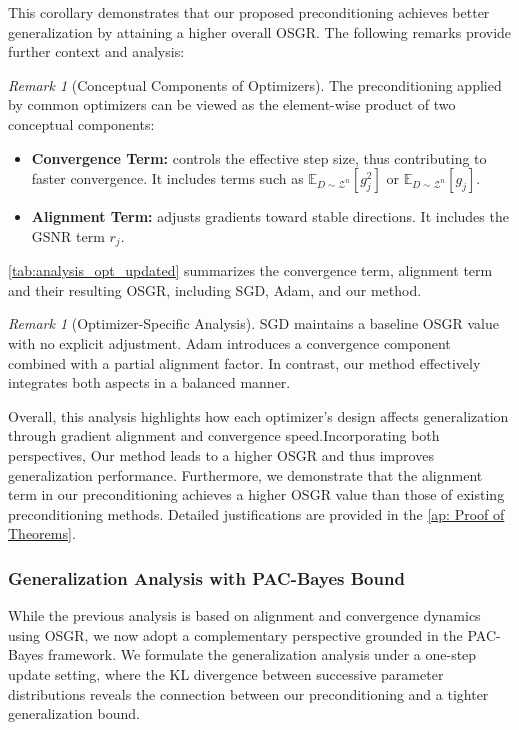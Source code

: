 \documentclass{article}
\theoremstyle{plain}
\theoremstyle{definition}
\theoremstyle{remark}
\newtheorem{remark}[theorem]{Remark}
\begin{document}
This corollary demonstrates that our proposed preconditioning achieves better generalization by attaining a higher overall OSGR. The following remarks provide further context and analysis:

\begin{remark}[Conceptual Components of Optimizers]
The preconditioning applied by common optimizers can be viewed as the element-wise product of two conceptual components:
\begin{itemize}
    \item \textbf{Convergence Term:} controls the effective step size, thus contributing to faster convergence. It includes terms such as $\mathbb{E}_{D \sim \mathcal{Z}^n}[g_j^2]$ or $\mathbb{E}_{D \sim \mathcal{Z}^n}[g_j]$.
    \item \textbf{Alignment Term:} adjusts gradients toward stable directions. It includes the GSNR term $r_j$.
\end{itemize}
\cref{tab:analysis_opt_updated} summarizes the convergence term, alignment term and their resulting OSGR, including SGD, Adam, and our method.
\end{remark}

\begin{remark}[Optimizer-Specific Analysis]
SGD maintains a baseline OSGR value with no explicit adjustment. Adam introduces a convergence component combined with a partial alignment factor. In contrast, our method effectively integrates both aspects in a balanced manner.
\end{remark}

Overall, this analysis highlights how each optimizer’s design affects generalization through gradient alignment and convergence speed.Incorporating both perspectives, Our method leads to a higher OSGR and thus improves generalization performance. Furthermore, we demonstrate that the alignment term in our preconditioning achieves a higher OSGR value than those of existing preconditioning methods. Detailed justifications are provided in the \cref{ap: Proof of Theorems}.


\subsubsection{Generalization Analysis with PAC-Bayes Bound}
\label{method: PAC-Bayes}
While the previous analysis is based on alignment and convergence dynamics using OSGR, we now adopt a complementary perspective grounded in the PAC-Bayes framework. We formulate the generalization analysis under a one-step update setting, where the KL divergence between successive parameter distributions reveals the connection between our preconditioning and a tighter generalization bound.
\end{document}
